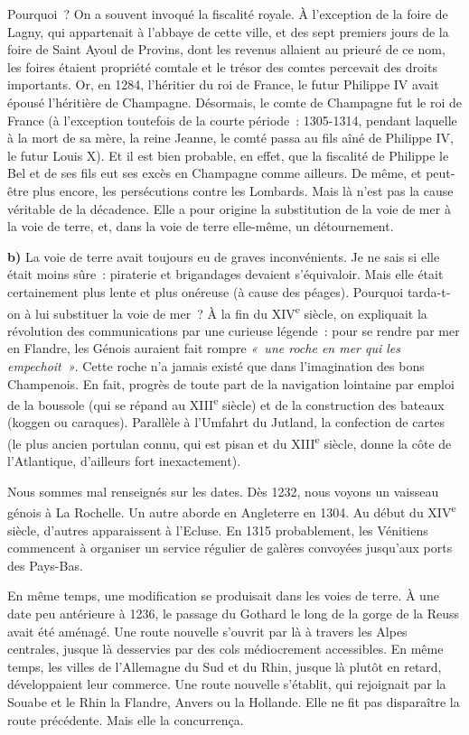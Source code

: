 \documentclass[french,twoside]{book} %
\newcommand{\labelchar}[1]{\textbf{\color{rubric} #1}}
\begin{document}
Pourquoi ? On a souvent invoqué la fiscalité royale. À l’exception de la foire de Lagny, qui appartenait à l’abbaye de cette ville, et des sept premiers jours de la foire de Saint Ayoul de Provins, dont les revenus allaient au prieuré de ce nom, les foires étaient propriété comtale et le trésor des comtes percevait des droits importants. Or, en 1284, l’héritier du roi de France, le futur Philippe IV avait épousé l’héritière de Champagne. Désormais, le comte de Champagne fut le roi de France (à l’exception toutefois de la courte période : 1305-1314, pendant laquelle à la mort de sa mère, la reine Jeanne, le comté passa au fils aîné de Philippe IV, le futur Louis X). Et il est bien probable, en effet, que la fiscalité de Philippe le Bel et de ses fils eut ses excès en Champagne comme ailleurs. De même,  
\label{p87} et peut-être plus encore, les persécutions contre les Lombards. Mais là n’est pas la cause véritable de la décadence. Elle a pour origine la substitution de la voie de mer à la voie de terre, et, dans la voie de terre elle-même, un détournement.\par
\bigbreak
\noindent \labelchar{b)} La voie de terre avait toujours eu de graves inconvénients. Je ne sais si elle était moins sûre : piraterie et brigandages devaient s’équivaloir. Mais elle était certainement plus lente et plus onéreuse (à cause des péages). Pourquoi tarda-t-on à lui substituer la voie de mer ? À la fin du XIV\textsuperscript{e} siècle, on expliquait la révolution des communications par une curieuse légende : pour se rendre par mer en Flandre, les Génois auraient fait rompre \emph{« une roche en mer qui les empechoit »}. Cette roche n’a jamais existé que dans l’imagination des bons Champenois. En fait, progrès de toute part de la navigation lointaine par emploi de la boussole (qui se répand au XIII\textsuperscript{e} siècle) et de la construction des bateaux (koggen ou caraques). Parallèle à l’Umfahrt du Jutland, la confection de cartes (le plus ancien portulan connu, qui est pisan et du XIII\textsuperscript{e} siècle, donne la côte de l’Atlantique, d’ailleurs fort inexactement).\par
Nous sommes mal renseignés sur les dates. Dès 1232, nous voyons un vaisseau génois à La Rochelle. Un autre aborde en Angleterre en 1304. Au début du XIV\textsuperscript{e} siècle, d’autres apparaissent à l’Ecluse. En 1315 probablement, les Vénitiens commencent à organiser un service régulier de galères convoyées jusqu’aux ports des Pays-Bas.\par
En même temps, une modification se produisait dans les voies de terre. À une date peu antérieure à 1236, le passage du Gothard le long de la gorge de la Reuss avait été aménagé. Une route nouvelle s’ouvrit par là à travers les Alpes centrales, jusque là desservies par des cols médiocrement accessibles. En même temps, les villes de l’Allemagne du Sud et du Rhin, jusque là plutôt en retard, développaient leur commerce. Une route nouvelle s’établit, qui rejoignait par la Souabe et le Rhin la Flandre, Anvers ou la Hollande. Elle ne fit pas disparaître la route précédente. Mais elle la concurrença.\par
\end{document}
